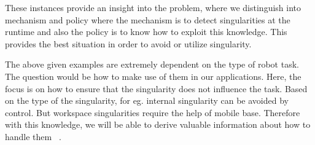 These instances provide an insight into the problem, where we distinguish into mechanism and policy where the mechanism is to detect singularities at the runtime and also the policy is to know how to exploit this knowledge. This provides the best situation in order to avoid or utilize singularity.


The above given examples are extremely dependent on the type of robot task. The question would be how to make use of them in our applications. Here, the focus is on how to ensure that the singularity does not influence the task. Based on the type of the singularity, for eg. internal singularity can be avoided by control. But workspace singularities require the help of mobile base. Therefore with this knowledge, we will be able to derive valuable information about how to handle them ~\cite{Buss2004}.


	